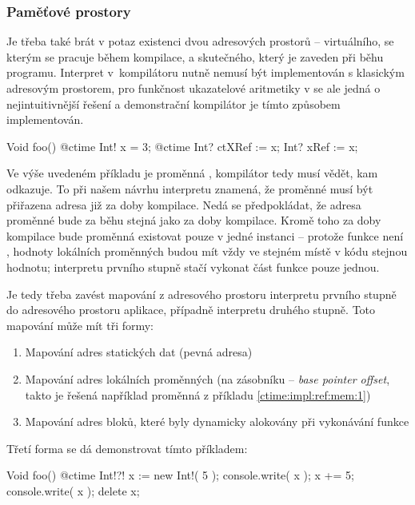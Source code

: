 \subsubsection{Paměťové prostory}
Je třeba také brát v potaz existenci dvou adresových prostorů -- virtuálního, se kterým se pracuje během kompilace, a skutečného, který je zaveden při běhu programu. Interpret v~kompilátoru nutně nemusí být implementován s klasickým adresovým prostorem, pro funkčnost ukazatelové aritmetiky v \ctime se ale jedná o nejintuitivnější řešení a demonstrační kompilátor je tímto způsobem implementován.

\begin{code}[\label{ctime:impl:ref:mem:1}]
Void foo() {
	@ctime Int! x = 3;
	@ctime Int? ctXRef := x;
	Int? xRef := x;
}
\end{code}

Ve výše uvedeném příkladu je proměnná  \ctime, kompilátor tedy musí vědět, kam odkazuje. To při našem návrhu interpretu znamená, že proměnné  musí být přiřazena adresa již za doby kompilace. Nedá se předpokládat, že adresa proměnné  bude za běhu stejná jako za doby kompilace. Kromě toho za doby kompilace bude proměnná  existovat pouze v jedné instanci -- protože funkce  není \ctime, hodnoty lokálních \ctime proměnných budou mít vždy ve stejném místě v kódu stejnou hodnotu; interpretu prvního stupně stačí vykonat \ctime část funkce pouze jednou.

Je tedy třeba zavést mapování z adresového prostoru interpretu prvního stupně do adresového prostoru aplikace, případně interpretu druhého stupně. Toto mapování může mít tři formy:
\begin{enumerate}
	\item Mapování adres statických dat (pevná adresa)
	\item Mapování adres lokálních proměnných (na zásobníku -- \textit{base pointer offset}, takto je řešená například proměnná  z příkladu \ref{ctime:impl:ref:mem:1})
	\item Mapování adres \ctime bloků, které byly dynamicky alokovány při vykonávání \nonctime funkce
\end{enumerate}

Třetí forma se dá demonstrovat tímto příkladem:
\begin{code}
Void foo() {
	@ctime Int!?! x := new Int!( 5 );
	console.write( x );
	x += 5;
	console.write( x );
	delete x;
}
\end{code}

